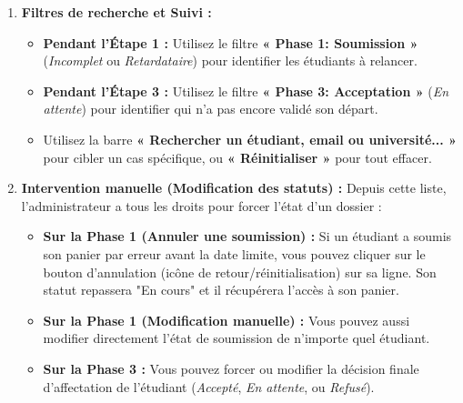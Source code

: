 \documentclass[12pt,a4paper]{article}
\begin{document}
\begin{enumerate}
    \item \textbf{Filtres de recherche et Suivi :}
    \begin{itemize}[leftmargin=*]
        \item \textbf{Pendant l'Étape 1 :} Utilisez le filtre \textbf{« Phase 1: Soumission »} (\textit{Incomplet} ou \textit{Retardataire}) pour identifier les étudiants à relancer.
        \item \textbf{Pendant l'Étape 3 :} Utilisez le filtre \textbf{« Phase 3: Acceptation »} (\textit{En attente}) pour identifier qui n'a pas encore validé son départ.
        \item Utilisez la barre \textbf{« Rechercher un étudiant, email ou université... »} pour cibler un cas spécifique, ou \textbf{« Réinitialiser »} pour tout effacer.
    \end{itemize}

    \item \textbf{Intervention manuelle (Modification des statuts) :}
    Depuis cette liste, l'administrateur a tous les droits pour forcer l'état d'un dossier :
    \begin{itemize}[leftmargin=*]
        \item \textbf{Sur la Phase 1 (Annuler une soumission) :} Si un étudiant a soumis son panier par erreur avant la date limite, vous pouvez cliquer sur le bouton d'annulation (icône de retour/réinitialisation) sur sa ligne. Son statut repassera "En cours" et il récupérera l'accès à son panier.
        \item \textbf{Sur la Phase 1 (Modification manuelle) :} Vous pouvez aussi modifier directement l'état de soumission de n'importe quel étudiant.
        \item \textbf{Sur la Phase 3 :} Vous pouvez forcer ou modifier la décision finale d'affectation de l'étudiant (\textit{Accepté}, \textit{En attente}, ou \textit{Refusé}).
    \end{itemize}


\end{enumerate}
\end{document}

